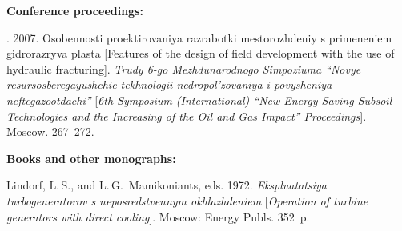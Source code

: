 {\begin{enumerate}[1.]
\def\leftfootline{\small{\textbf{\thepage}
\hfill INFORMATIKA I EE PRIMENENIYA~--- INFORMATICS AND APPLICATIONS\ \ \ 2016\
\ \ volume~10\ \ \ issue\ 2}
}%
 \def\rightfootline{\small{INFORMATIKA I EE PRIMENENIYA~--- INFORMATICS AND APPLICATIONS\ \ \ 2016\ \ \ volume~10\ \ \ issue\ 2
\hfill \textbf{\thepage}}}

\def\leftkol{Requirements for manuscripts submitted to Journal
``Informatics~and~Applications''}

\def\rightkol{Requirements for manuscripts submitted to Journal
``Informatics~and~Applications''}

\noindent
\textbf{Conference proceedings:}

. 2007. Osobennosti proektirovaniya razrabotki mestorozhdeniy
s primeneniem gidrorazryva
plasta [Features of the design of field development with the use of hydraulic fracturing].
\textit{Trudy 6-go
Mezhdu\-na\-rod\-no\-go Simpoziuma ``Novye resursosberegayushchie tekhnologii
nedropol'zovaniya i povysheniya
neftegazootdachi''} [\textit{6th  Symposium (International) ``New Energy Saving Subsoil
Technologies and
the Increasing of the Oil and Gas Impact'' Proceedings}]. Moscow. 267--272.


\noindent
\textbf{Books and other monographs:}




Lindorf, L.\,S., and L.\,G.~Mamikoniants, eds. 1972.
\textit{Ekspluatatsiya turbogeneratorov s neposredstvennym
okhlazhdeniem} [\textit{Operation of turbine generators with direct cooling}].
Moscow: Energy Publs. 352~p.











\end{enumerate}}
